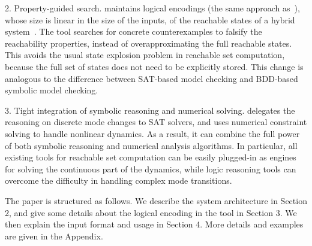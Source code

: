 2. Property-guided search. \dReach{} maintains logical encodings (the
same approach as~\cite{DBLP:conf/aaai/CimattiMT12}), whose size is
linear in the size of the inputs, of the reachable states of a hybrid system~\cite{DBLP:journals/corr/GaoKCC14}. The tool searches for concrete counterexamples to falsify the reachability properties, instead of overapproximating the full reachable states.
This avoids the usual state explosion problem in reachable set computation, because the full set of states does not need to be explicitly stored. This change
is analogous to the difference between SAT-based model checking and BDD-based symbolic model checking.

3. Tight integration of symbolic reasoning and numerical solving. \dReach{} delegates the
reasoning on discrete mode changes to SAT solvers, and uses numerical constraint solving to handle nonlinear dynamics.
As a result, it can combine the full power of both symbolic reasoning and numerical analysis algorithms. In particular,
all existing tools for reachable set computation can be easily plugged-in as engines for solving
the continuous part of the dynamics, while logic reasoning tools can overcome the difficulty
in handling complex mode transitions.

The paper is structured as follows. We describe the system architecture in Section 2,
and give some details about the logical encoding in the tool in Section 3.
We then explain the input format and usage in Section 4. More details and examples are given in the Appendix.



